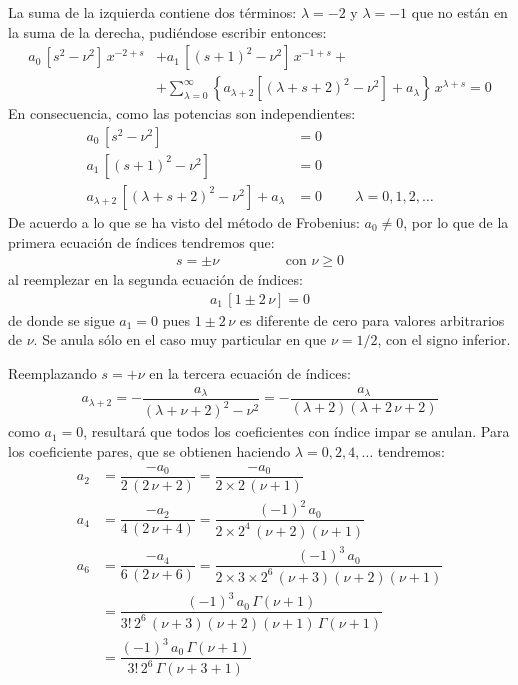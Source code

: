 La suma de la izquierda contiene dos términos: $\lambda=-2$ y $\lambda=-1$ que no están en la suma de la derecha, pudiéndose escribir entonces:
\begin{align*}
a_{0} \, [s^{2} - \nu^{2}] \, x^{-2+s} &+ a_{1} \, [(s+1)^{2} - \nu^{2}] \, x^{-1+s} + \\[0.5em]
&+ \sum_{\lambda=0}^{\infty} \left\{ a_{\lambda+2} [(\lambda + s + 2)^{2} - \nu^{2}] + a_{\lambda} \right\} \, x^{\lambda + s} = 0
\end{align*}
En consecuencia, como las potencias son independientes:
\begin{align*}
a_{0} \, [s^{2} - \nu^{2}] &= 0 \\[0.5em]
a_{1} \, [(s + 1)^{2} - \nu^{2}] &= 0 \\[0.5em]
a_{\lambda+2} \, [(\lambda + s + 2)^{2} - \nu^{2}] + a_{\lambda} &= 0 \hspace{1cm} \lambda=0, 1, 2, \ldots
\end{align*}
De acuerdo a lo que se ha visto del método de Frobenius: $a_{0} \neq 0$, por lo que de la primera ecuación de índices tendremos que:
\begin{align}
s = \pm \nu \hspace{2cm} \mbox{con } \nu \geq 0
\label{eq:ecuacion_08_04}
\end{align}
al reemplezar en la segunda ecuación de índices:
\begin{align*}
a_{1} \, [1 \pm 2 \, \nu] = 0
\end{align*}
de donde se sigue $a_{1} = 0$ pues $1 \pm 2 \, \nu$ es diferente de cero para valores arbitrarios de $\nu$. Se anula sólo en el caso muy particular en que $\nu = 1/2$, con el signo inferior.
\par
Reemplazando $s = + \nu$ en la tercera ecuación de índices:
\begin{align*}
a_{\lambda+2} = - \dfrac{a_{\lambda}}{(\lambda + \nu + 2)^{2} - \nu^{2}} = - \dfrac{a_{\lambda}}{(\lambda + 2)(\lambda + 2 \, \nu + 2)}
\end{align*}
como $a_{1} = 0$, resultará que todos los coeficientes con índice impar se anulan. Para los coeficiente pares, que se obtienen haciendo $\lambda = 0, 2, 4, \ldots$ tendremos:
\begin{align*}
a_{2} &= \dfrac{-a_{0}}{2 \, (2 \, \nu + 2)} = \dfrac{-a_{0}}{2 \times 2 \, (\nu + 1)} \\[0.5em]
a_{4} &= \dfrac{-a_{2}}{4 \, (2 \, \nu + 4)} = \dfrac{(-1)^{2} \, a_{0}}{2 \times 2^{4} \, (\nu + 2)(\nu + 1)} \\[0.5em]
a_{6} &= \dfrac{-a_{4}}{6 \, (2 \, \nu + 6)} = \dfrac{(-1)^{3} \, a_{0}}{2 \times 3 \times 2^{6} \, (\nu + 3)(\nu + 2)(\nu + 1)} \\[0.5em]
&= \dfrac{(-1)^{3} \, a_{0} \, \Gamma (\nu + 1)}{3! \, 2^{6} \, (\nu + 3)(\nu + 2)(\nu + 1) \, \Gamma (\nu + 1)} \\[0.5em]
&= \dfrac{(-1)^{3} \, a_{0} \, \Gamma (\nu + 1)}{3! \, 2^{6} \, \Gamma (\nu + 3 + 1)}
\end{align*}
